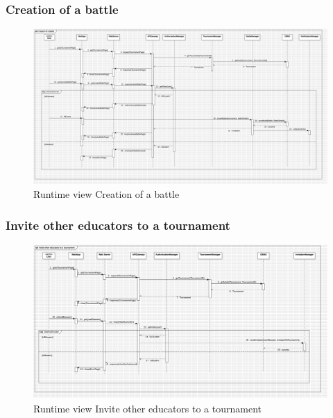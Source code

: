 \subsubsection*{Creation of a battle}
\begin{figure}[H]
    \centering
    \includegraphics[width=\textwidth]{Diagrams/CreationBattleSD.jpg}
    \caption{Runtime view Creation of a battle}
    \label{fig:runtime_view_battle_creation}
\end{figure}
\subsubsection*{Invite other educators to a tournament}
\begin{figure}[H]
    \centering
    \includegraphics[width=\textwidth]{Diagrams/InviteEducatorSD.jpg}
    \caption{Runtime view Invite other educators to a tournament}
    \label{fig:runtime_view_invite_educator}
\end{figure}
